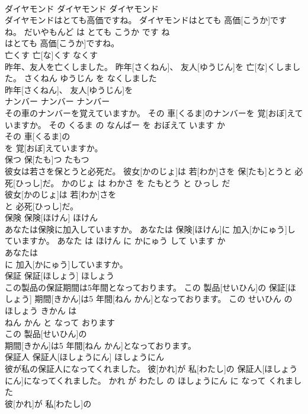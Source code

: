 \documentclass[8pt]{extreport}
\begin{document}
\begin{CJK}{UTF8}{min}
\\	ダイヤモンド	ダイヤモンド	ダイヤモンド	
\\	ダイヤモンドはとても高価ですね。	ダイヤモンドはとても 高価[こうか]ですね。	だいやもんど は とても こうか です ね	
\\	はとても 高価[こうか]ですね。			
\\	亡くす	亡[な]くす	なくす	
\\	昨年、友人を亡くしました。	昨年[さくねん]、 友人[ゆうじん]を 亡[な]くしました。	さくねん ゆうじん を なくしました	
\\	昨年[さくねん]、 友人[ゆうじん]を
\\	ナンバー	ナンバー	ナンバー	
\\	その車のナンバーを覚えていますか。	その 車[くるま]のナンバーを 覚[おぼ]えていますか。	その くるま の なんばー を おぼえて います か	
\\	その 車[くるま]の
\\	を 覚[おぼ]えていますか。			
\\	保つ	保[たも]つ	たもつ	
\\	彼女は若さを保とうと必死だ。	彼女[かのじょ]は 若[わか]さを 保[たも]とうと 必死[ひっし]だ。	かのじょ は わかさ を たもとう と ひっし だ	
\\	彼女[かのじょ]は 若[わか]さを
\\	と 必死[ひっし]だ。			
\\	保険	保険[ほけん]	ほけん	
\\	あなたは保険に加入していますか。	あなたは 保険[ほけん]に 加入[かにゅう]していますか。	あなた は ほけん に かにゅう して います か	
\\	あなたは
\\	に 加入[かにゅう]していますか。			
\\	保証	保証[ほしょう]	ほしょう	
\\	この製品の保証期間は5年間となっております。	この 製品[せいひん]の 保証[ほしょう] 期間[きかん]は5 年間[ねん かん]となっております。	この せいひん の ほしょう きかん は 
\\	ねん かん と なって おります	
\\	この 製品[せいひん]の
\\	期間[きかん]は5 年間[ねん かん]となっております。			
\\	保証人	保証人[ほしょうにん]	ほしょうにん	
\\	彼が私の保証人になってくれました。	彼[かれ]が 私[わたし]の 保証人[ほしょうにん]になってくれました。	かれ が わたし の ほしょうにん に なって くれました	
\\	彼[かれ]が 私[わたし]の

\end{CJK}
\end{document}
